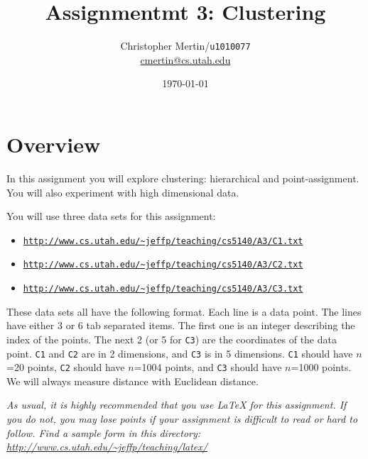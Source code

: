 \documentclass[11pt]{article}
\title{Assignmentmt 3: Clustering}
\author{Christopher Mertin/\verb~u1010077~\\\url{cmertin@cs.utah.edu}}
\date{\today}
\begin{document}
\maketitle




\section*{Overview}

In this assignment you will explore clustering: hierarchical and point-assignment.  
You will also experiment with high dimensional data.  

You will use three data sets for this assignment:
\begin{itemize} \denselist
\item \href{http://www.cs.utah.edu/~jeffp/teaching/cs5140/A3/C1.txt}{\texttt{http://www.cs.utah.edu/\~{}jeffp/teaching/cs5140/A3/C1.txt}}
\item \href{http://www.cs.utah.edu/~jeffp/teaching/cs5140/A3/C2.txt}{\texttt{http://www.cs.utah.edu/\~{}jeffp/teaching/cs5140/A3/C2.txt}}
\item \href{http://www.cs.utah.edu/~jeffp/teaching/cs5140/A3/C3.txt}{\texttt{http://www.cs.utah.edu/\~{}jeffp/teaching/cs5140/A3/C3.txt}}
\end{itemize}
These data sets all have the following format.  Each line is a data point.  The lines have either 3 or 6 tab separated items.  The first one is an integer describing the index of the points.  The next 2 (or 5 for \texttt{C3}) are the coordinates of the data point.  \texttt{C1} and \texttt{C2} are in 2 dimensions, and \texttt{C3} is in 5 dimensions.  \texttt{C1} should have $n$=20 points, \texttt{C2} should have $n$=1004 points, and \texttt{C3} should have $n$=1000 points.  
We will always measure distance with Euclidean distance.  


\vspace{.1in}

\emph{As usual, it is highly recommended that you use LaTeX for this assignment.  If you do not, you may lose points if your assignment is difficult to read or hard to follow.  Find a sample form in this directory:
\url{http://www.cs.utah.edu/~jeffp/teaching/latex/}}


\end{document}
